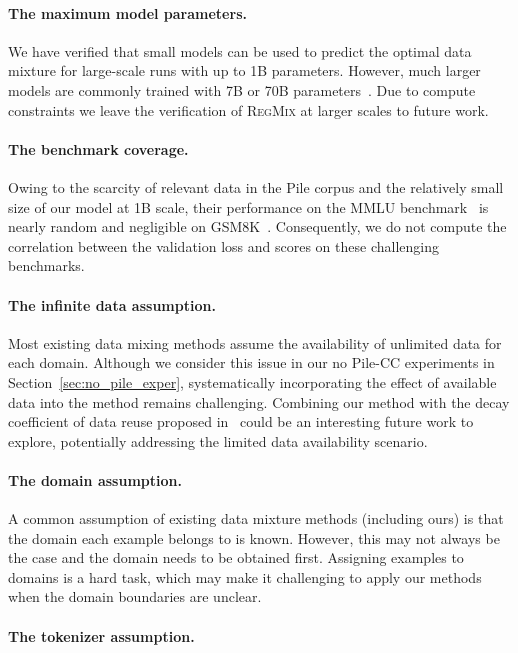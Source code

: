 \documentclass{article}
\theoremstyle{definition}
\theoremstyle{remark}
\newcommand{\ourmethod}{\textsc{RegMix}\xspace}
\begin{document}
\paragraph{The maximum model parameters.} We have verified that small models can be used to predict the optimal data mixture for large-scale runs with up to 1B parameters. However, much larger models are commonly trained with 7B or 70B parameters~\citep{llama2paper}. Due to compute constraints we leave the verification of \ourmethod at larger scales to future work.

\paragraph{The benchmark coverage.} Owing to the scarcity of relevant data in the Pile corpus and the relatively small size of our model at 1B scale, their performance on the MMLU benchmark~\citep{MMLU2021} is nearly random and negligible on GSM8K~\citep{gsm8k2021}. Consequently, we do not compute the correlation between the validation loss and scores on these challenging benchmarks.

\paragraph{The infinite data assumption.} Most existing data mixing methods assume the availability of unlimited data for each domain. Although we consider this issue in our no Pile-CC experiments in Section~\ref{sec:no_pile_exper}, systematically incorporating the effect of available data into the method remains challenging. Combining our method with the decay coefficient of data reuse proposed in~\citet{muennighoff2023scaling} could be an interesting future work to explore, potentially addressing the limited data availability scenario.

\paragraph{The domain assumption.} 

A common assumption of existing data mixture methods (including ours) is that the domain each example belongs to is known. However, this may not always be the case and the domain needs to be obtained first. Assigning examples to domains is a hard task, which may make it challenging to apply our methods when the domain boundaries are unclear.

\paragraph{The tokenizer assumption.}
\end{document}
